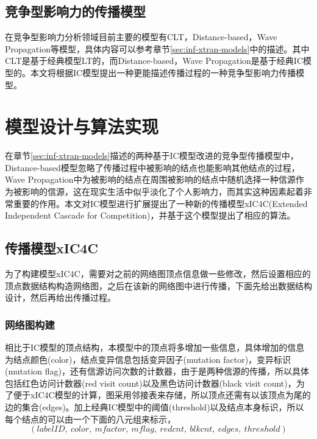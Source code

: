 
\subsection{竞争型影响力的传播模型}
在竞争型影响力分析领域目前主要的模型有CLT，Distance-based，Wave Propagation等模型，具体内容可以参考章节\ref{sec:inf-xtran-models}中的描述。其中CLT是基于经典模型LT的，而Distance-based，Wave Propagation是基于经典IC模型的。本文将根据IC模型提出一种更能描述传播过程的一种竞争型影响力传播模型。


\section{模型设计与算法实现}
在章节\ref{sec:inf-xtran-models}描述的两种基于IC模型改进的竞争型传播模型中，Distance-based模型忽略了传播过程中被影响的结点也能影响其他结点的过程，Wave Propagation中为被影响的结点在周围被影响的结点中随机选择一种信源作为被影响的信源，这在现实生活中似乎淡化了个人影响力，而其实这种因素起着非常重要的作用。本文对IC模型进行扩展提出了一种新的传播模型xIC4C(Extended Independent Cascade for Competition)，并基于这个模型提出了相应的算法。


\subsection{传播模型xIC4C}
为了构建模型xIC4C，需要对之前的网络图顶点信息做一些修改，然后设置相应的顶点数据结构构造网络图，之后在该新的网络图中进行传播，下面先给出数据结构设计，然后再给出传播过程。

\subsubsection{网络图构建}
相比于IC模型的顶点结构，本模型中的顶点将多增加一些信息，具体增加的信息为结点颜色(color)，结点变异信息包括变异因子(mutation factor)，变异标识(mutation flag)，还有信源访问次数的计数器，由于是两种信源的传播，所以具体包括红色访问计数器(red visit count)以及黑色访问计数器(black visit count)，为了便于xIC4C模型的计算，图采用邻接表来存储，所以顶点还需有以该顶点为尾的边的集合(edges)。加上经典IC模型中的阈值(threshold)以及结点本身标识，所以每个结点的可以由一个下面的八元组来标示，
\begin{displaymath}
(labelID, ~color, ~mfactor, ~mflag, ~redcnt, ~blkcnt, ~edges, ~threshold)
\end{displaymath}


